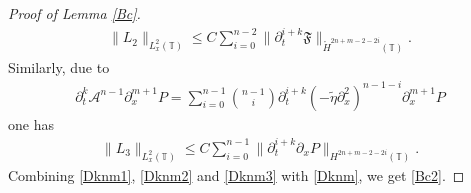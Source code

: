 \documentclass{amsart}
\numberwithin{equation}{section}
\begin{document}
\begin{proof}[Proof of Lemma \ref{Bc}]
\begin{align}\label{Dknm2}
\|L_{2}\|_{L_{x}^{2}(\mathbb{T})}
\leq C\sum_{i=0}^{n-2}\|\partial_{t}^{i+k}\mathfrak{F}\|_{\mathring{H}^{2n+m-2-2i}(\mathbb{T})}.
\end{align}
Similarly, due to
\begin{align*}
\partial_{t}^{k}\mathcal{A}^{n-1}\partial_{x}^{m+1}P
=\sum_{i=0}^{n-1}\binom{n-1}{i}\partial_{t}^{i+k}(-\tilde{\eta}\partial_{x}^{2})^{n-1-i}\partial_{x}^{m+1}P
\end{align*}
one has
\begin{align}\label{Dknm3}
\|L_{3}\|_{L_{x}^{2}(\mathbb{T})}
\leq C\sum_{i=0}^{n-1}\|\partial_{t}^{i+k}\partial_{x}P\|_{H^{2n+m-2-2i}(\mathbb{T})}.
\end{align}
Combining \eqref{Dknm1}, \eqref{Dknm2} and \eqref{Dknm3} with \eqref{Dknm}, we get \eqref{Bc2}.

\end{proof}
\end{document}
